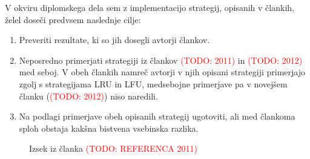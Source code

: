 \documentclass[a4paper, 12pt]{book}
\newcommand{\TODO}[1]{\textcolor{red}{(TODO: #1)}}
\begin{document}
\begin{minipage}{\textwidth}

V okviru diplomskega dela sem z implementacijo strategij, opisanih v
člankih, želel doseči predvsem naslednje cilje:
\label{cilji}

\begin{enumerate}
\item Preveriti rezultate, ki so jih dosegli avtorji člankov.

\item Neposredno primerjati strategiji iz člankov \TODO{2011} in
\TODO{2012} med seboj. V obeh člankih namreč avtorji v njih opisani
strategiji primerjajo zgolj s strategijama LRU in LFU, medsebojne
primerjave pa v novejšem članku (\TODO{2012}) niso naredili.

\item Na podlagi primerjave obeh opisanih strategij ugotoviti, ali med
član\-koma sploh obstaja kakšna bistvena vsebinska razlika.
\end{enumerate}

\end{minipage}

\begin{figure}
  \begin{center}
  \end{center}
  \caption{Izsek iz članka \TODO{REFERENCA 2011}}
  \label{pic2011}
\end{figure}
\end{document}
